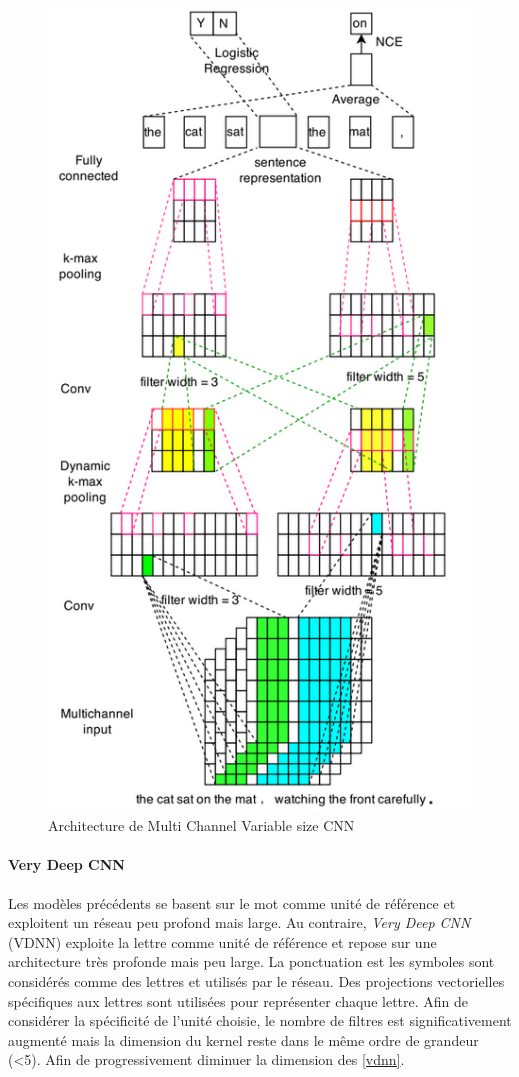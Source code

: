 \begin{figure}
\centering
\includegraphics[scale=0.3]{./tex/natural-language-processing/multichannel.png}
\caption{Architecture de Multi Channel Variable size CNN}
\label{multichannel}
\end{figure}

\paragraph{Very Deep CNN}
Les modèles précédents se basent sur le mot comme unité de référence et exploitent un réseau peu profond mais large. Au contraire, \textit{Very Deep CNN} (VDNN)\cite{vdnn} exploite la lettre comme unité de référence et repose sur une architecture très profonde mais peu large. La ponctuation est les symboles sont considérés comme des lettres et utilisés par le réseau. Des projections vectorielles spécifiques aux lettres sont utilisées pour représenter chaque lettre. Afin de considérer la spécificité de l'unité choisie, le nombre de filtres est significativement augmenté mais la dimension du kernel reste dans le même ordre de grandeur (<5). Afin de progressivement diminuer la dimension des \ref{vdnn}.\\

